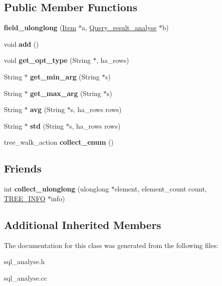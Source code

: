 \subsection*{Public Member Functions}
\begin{DoxyCompactItemize}
\item 
\mbox{\label{classfield__ulonglong_aab46fa762894142e2812fbec908e8230}} 
{\bfseries field\+\_\+ulonglong} (\mbox{\hyperlink{classItem}{Item}} $\ast$a, \mbox{\hyperlink{classQuery__result__analyse}{Query\+\_\+result\+\_\+analyse}} $\ast$b)
\item 
\mbox{\label{classfield__ulonglong_a3cb442416bdb02263ac4a8aaa5803224}} 
void {\bfseries add} ()
\item 
\mbox{\label{classfield__ulonglong_ac15b1689a7a53a6ca1728e338114ad7d}} 
void {\bfseries get\+\_\+opt\+\_\+type} (String $\ast$, ha\+\_\+rows)
\item 
\mbox{\label{classfield__ulonglong_ad79a903de05be87509ad02480f72f290}} 
String $\ast$ {\bfseries get\+\_\+min\+\_\+arg} (String $\ast$s)
\item 
\mbox{\label{classfield__ulonglong_a41c72b1302db9e513e5a11603b52e075}} 
String $\ast$ {\bfseries get\+\_\+max\+\_\+arg} (String $\ast$s)
\item 
\mbox{\label{classfield__ulonglong_a8729a4b0e69f1b06e4de47a32d3a7c3e}} 
String $\ast$ {\bfseries avg} (String $\ast$s, ha\+\_\+rows rows)
\item 
\mbox{\label{classfield__ulonglong_a935546efc123e1165685da7ecb1d02ab}} 
String $\ast$ {\bfseries std} (String $\ast$s, ha\+\_\+rows rows)
\item 
\mbox{\label{classfield__ulonglong_afe1b0be4fb3ebf3cb8965802f3c91fae}} 
tree\+\_\+walk\+\_\+action {\bfseries collect\+\_\+enum} ()
\end{DoxyCompactItemize}
\subsection*{Friends}
\begin{DoxyCompactItemize}
\item 
\mbox{\label{classfield__ulonglong_acd6f8e911f231e029d78edffafa82b43}} 
int {\bfseries collect\+\_\+ulonglong} (ulonglong $\ast$element, element\+\_\+count count, \mbox{\hyperlink{structst__tree__info}{T\+R\+E\+E\+\_\+\+I\+N\+FO}} $\ast$info)
\end{DoxyCompactItemize}
\subsection*{Additional Inherited Members}


The documentation for this class was generated from the following files\+:\begin{DoxyCompactItemize}
\item 
sql\+\_\+analyse.\+h\item 
sql\+\_\+analyse.\+cc\end{DoxyCompactItemize}
